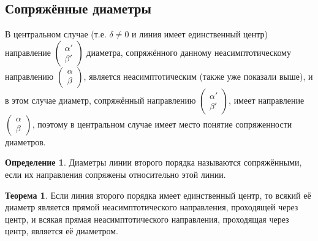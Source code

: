 \documentclass[a4paper, 12pt]{article}
\theoremstyle{definition}
\newtheorem*{definition}{Определение}
\newtheorem*{theorem}{Теорема}
\begin{document}
	\subsection{Сопряжённые диаметры}
	В центральном случае (т.е. $\delta \neq 0$ и линия имеет единственный центр) направление $\begin{pmatrix} \alpha' \\ \beta' \end{pmatrix}$ диаметра, сопряжённого данному неасимптотическому направлению $\begin{pmatrix} \alpha \\ \beta \end{pmatrix}$, является неасимптотическим (также уже показали выше), и в этом случае диаметр, сопряжённый направлению $\begin{pmatrix} \alpha' \\ \beta' \end{pmatrix}$, имеет направление $\begin{pmatrix} \alpha \\ \beta \end{pmatrix}$, поэтому в центральном случае имеет место понятие сопряженности диаметров.
	\begin{definition}
		Диаметры линии второго порядка называются сопряжёнными, если их направления сопряжены относительно этой линии.
	\end{definition}
	\begin{theorem}
		Если линия второго порядка имеет единственный центр, то всякий её диаметр является прямой неасимптотического направления, проходящей через центр, и всякая прямая неасимптотического направления, проходящая через центр, является её диаметром.
	\end{theorem}
\end{document}
